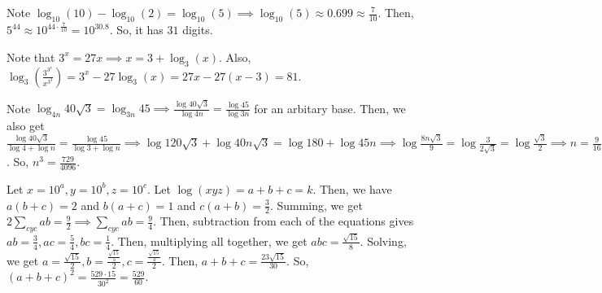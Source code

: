 \documentclass[11pt]{article}
\begin{document}

\begin{sol}
Note $\log_{10}(10)-\log_{10}(2)=\log_{10}(5)\implies \log_{10}(5) \approx 0.699\approx \frac{7}{10}$. Then, $5^{44}\approx 10^{44\cdot \frac{7}{10}}=10^{30.8}$. So, it has $\boxed{31}$ digits.
\end{sol}



\begin{sol}
Note that $3^{x}=27x\implies x=3+\log_{3}(x)$. Also, $\log_{3}(\frac{3^{3^x}}{x^{3^{3}}}) = 3^{x}-27\log_{3}(x)=27x-27(x-3)=\boxed{81}$.
\end{sol}



\begin{sol}
Note $\log_{4n} 40\sqrt{3} = \log_{3n} 45\implies \frac{\log 40\sqrt{3}}{\log 4n} = \frac{\log 45}{\log 3n}$ for an arbitary base. Then, we also get $\frac{\log 40\sqrt{3}}{\log 4 + \log n} = \frac{\log 45}{\log 3 + \log n}\implies \log 120\sqrt{3} + \log 40n\sqrt{3} = \log 180 + \log 45n \implies \log \frac{8n\sqrt{3}}{9} = \log \frac{3}{2\sqrt{3}}= \log \frac{\sqrt{3}}{2}\implies n = \frac{9}{16}$. So, $n^3=\boxed{\frac{729}{4096}}$.
\end{sol}



\begin{sol}
Let $x=10^{a}, y=10^{b}, z = 10^{c}$. Let $\log(xyz)=a+b+c=k$. Then, we have $a(b+c)=2$ and $b(a+c)=1$ and $c(a+b)=\frac{3}{2}$. Summing, we get $2\sum_{cyc} ab = \frac{9}{2}\implies \sum_{cyc} ab =\frac{9}{4}$. Then, subtraction from each of the equations gives $ab=\frac{3}{4}, ac=\frac{5}{4},bc=\frac{1}{4}$. Then, multiplying all together, we get $abc=\frac{\sqrt{15}}{8}$. Solving, we get $a=\frac{\sqrt{15}}{2}, b= \frac{\frac{\sqrt{15}}{5}}{2}, c=\frac{\frac{\sqrt{15}}{3}}{2}$. Then, $a+b+c=\frac{23\sqrt{15}}{30}$. So, $(a+b+c)^2=\frac{529\cdot 15}{30^2}=\boxed{\frac{529}{60}}$.
\end{sol}
\end{document}
